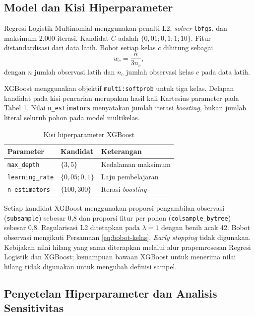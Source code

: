 \subsection{Model dan Kisi Hiperparameter}

Regresi Logistik Multinomial menggunakan penalti L2, \emph{solver} \texttt{lbfgs}, dan maksimum 2.000 iterasi. Kandidat $C$ adalah $\{0{,}01;0{,}1;1;10\}$. Fitur distandardisasi dari data latih. Bobot setiap kelas $c$ dihitung sebagai
\begin{equation}
w_c=\frac{n}{3n_c},
\label{eq:bobot-kelas}
\end{equation}
dengan $n$ jumlah observasi latih dan $n_c$ jumlah observasi kelas $c$ pada data latih.

XGBoost menggunakan objektif \texttt{multi:softprob} untuk tiga kelas. Delapan kandidat pada kisi pencarian merupakan hasil kali Kartesius parameter pada Tabel \ref{tab:kisi-xgboost}. Nilai \texttt{n\_estimators} menyatakan jumlah iterasi \emph{boosting}, bukan jumlah literal seluruh pohon pada model multikelas.

\begin{table}[htbp]
    \centering
    \caption{Kisi hiperparameter XGBoost}
    \label{tab:kisi-xgboost}
    \begin{tabular}{lll}
        \hline
        Parameter & Kandidat & Keterangan \\
        \hline
        \texttt{max\_depth} & $\{3,5\}$ & Kedalaman maksimum \\
        \texttt{learning\_rate} & $\{0{,}05;0{,}1\}$ & Laju pembelajaran \\
        \texttt{n\_estimators} & $\{100,300\}$ & Iterasi \emph{boosting} \\
        \hline
    \end{tabular}
\end{table}

Setiap kandidat XGBoost menggunakan proporsi pengambilan observasi (\texttt{subsample}) sebesar 0,8 dan proporsi fitur per pohon (\texttt{colsample\_bytree}) sebesar 0,8. Regularisasi L2 ditetapkan pada $\lambda=1$ dengan benih acak 42. Bobot observasi mengikuti Persamaan \ref{eq:bobot-kelas}. \emph{Early stopping} tidak digunakan. Kebijakan nilai hilang yang sama diterapkan melalui alur prapemrosesan Regresi Logistik dan XGBoost; kemampuan bawaan XGBoost untuk menerima nilai hilang tidak digunakan untuk mengubah definisi sampel.

\subsection{Penyetelan Hiperparameter dan Analisis Sensitivitas}

